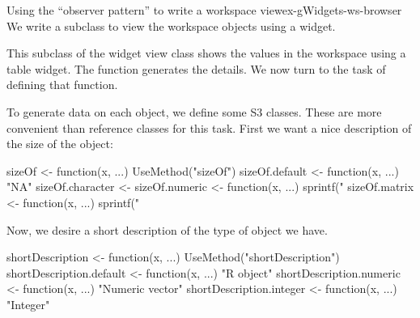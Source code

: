 \begin{example}{Using the ``observer pattern'' to write a workspace view}{ex-gWidgets-ws-browser}
We write a  subclass to view the workspace
objects using a  widget.
\begin{Schunk}
\end{Schunk}
%


This subclass of the widget view class shows
the values in the workspace using a table widget. The
 function generates the details. We now turn to
the task of defining that function.

To generate data on each object, we define some S3 classes. These are
more convenient than reference classes for this task. First we want a
nice description of the size of the object:
\begin{Schunk}
\begin{Sinput}
 sizeOf <- function(x, ...) UseMethod("sizeOf")
 sizeOf.default <- function(x, ...) "NA"
 sizeOf.character <- sizeOf.numeric <- 
   function(x, ...) sprintf("%
 sizeOf.matrix <- function(x, ...) 
   sprintf("%
\end{Sinput}
\end{Schunk}

%

Now, we desire a short description of the type of object we have.
\begin{Schunk}
\begin{Sinput}
 shortDescription <- function(x, ...) 
   UseMethod("shortDescription")
 shortDescription.default <- function(x, ...) "R object"
 shortDescription.numeric <- function(x, ...) "Numeric vector"
 shortDescription.integer <- function(x, ...) "Integer"
\end{Sinput}
\end{Schunk}
%


\end{example}
